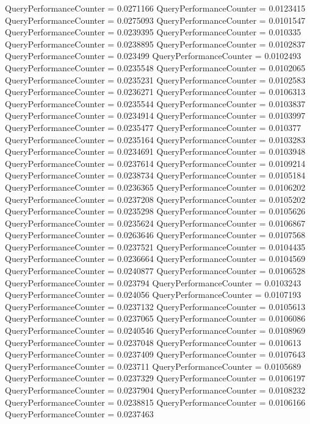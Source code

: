 \documentclass[9pt]{article}
\theoremstyle{plain}
\theoremstyle{definition}
\theoremstyle{remark}
\numberwithin{equation}{section}
\begin{document}
QueryPerformanceCounter  =  0.0271166
QueryPerformanceCounter  =  0.0123415
QueryPerformanceCounter  =  0.0275093
QueryPerformanceCounter  =  0.0101547
QueryPerformanceCounter  =  0.0239395
QueryPerformanceCounter  =  0.010335
QueryPerformanceCounter  =  0.0238895
QueryPerformanceCounter  =  0.0102837
QueryPerformanceCounter  =  0.023499
QueryPerformanceCounter  =  0.0102493
QueryPerformanceCounter  =  0.0235548
QueryPerformanceCounter  =  0.0102065
QueryPerformanceCounter  =  0.0235231
QueryPerformanceCounter  =  0.0102583
QueryPerformanceCounter  =  0.0236271
QueryPerformanceCounter  =  0.0106313
QueryPerformanceCounter  =  0.0235544
QueryPerformanceCounter  =  0.0103837
QueryPerformanceCounter  =  0.0234914
QueryPerformanceCounter  =  0.0103997
QueryPerformanceCounter  =  0.0235477
QueryPerformanceCounter  =  0.010377
QueryPerformanceCounter  =  0.0235164
QueryPerformanceCounter  =  0.0103283
QueryPerformanceCounter  =  0.0234691
QueryPerformanceCounter  =  0.0103948
QueryPerformanceCounter  =  0.0237614
QueryPerformanceCounter  =  0.0109214
QueryPerformanceCounter  =  0.0238734
QueryPerformanceCounter  =  0.0105184
QueryPerformanceCounter  =  0.0236365
QueryPerformanceCounter  =  0.0106202
QueryPerformanceCounter  =  0.0237208
QueryPerformanceCounter  =  0.0105202
QueryPerformanceCounter  =  0.0235298
QueryPerformanceCounter  =  0.0105626
QueryPerformanceCounter  =  0.0235624
QueryPerformanceCounter  =  0.0106867
QueryPerformanceCounter  =  0.0263646
QueryPerformanceCounter  =  0.0107568
QueryPerformanceCounter  =  0.0237521
QueryPerformanceCounter  =  0.0104435
QueryPerformanceCounter  =  0.0236664
QueryPerformanceCounter  =  0.0104569
QueryPerformanceCounter  =  0.0240877
QueryPerformanceCounter  =  0.0106528
QueryPerformanceCounter  =  0.023794
QueryPerformanceCounter  =  0.0103243
QueryPerformanceCounter  =  0.024056
QueryPerformanceCounter  =  0.0107193
QueryPerformanceCounter  =  0.0237132
QueryPerformanceCounter  =  0.0105613
QueryPerformanceCounter  =  0.0237065
QueryPerformanceCounter  =  0.0106086
QueryPerformanceCounter  =  0.0240546
QueryPerformanceCounter  =  0.0108969
QueryPerformanceCounter  =  0.0237048
QueryPerformanceCounter  =  0.010613
QueryPerformanceCounter  =  0.0237409
QueryPerformanceCounter  =  0.0107643
QueryPerformanceCounter  =  0.023711
QueryPerformanceCounter  =  0.0105689
QueryPerformanceCounter  =  0.0237329
QueryPerformanceCounter  =  0.0106197
QueryPerformanceCounter  =  0.0237904
QueryPerformanceCounter  =  0.0108232
QueryPerformanceCounter  =  0.0238815
QueryPerformanceCounter  =  0.0106166
QueryPerformanceCounter  =  0.0237463
\end{document}
